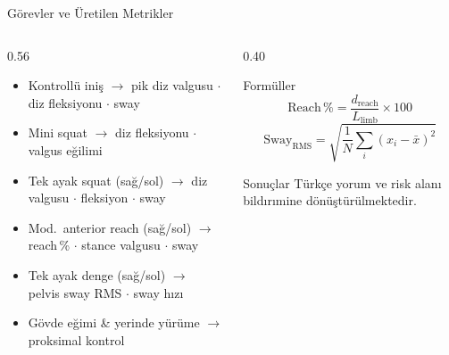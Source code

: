 \documentclass[aspectratio=169,12pt]{beamer}
\begin{document}
\begin{frame}{G\"{o}revler ve \"{U}retilen Metrikler}
  \begin{columns}[T]
    \begin{column}{0.56\textwidth}
      \begin{itemize}\setlength\itemsep{0.22em}
        \item Kontroll\"{u} ini\c{s} $\rightarrow$
              pik diz valgusu \(\cdot\) diz fleksiyonu \(\cdot\) sway
        \item Mini squat $\rightarrow$
              diz fleksiyonu \(\cdot\) valgus e\u{g}ilimi
        \item Tek ayak squat (sa\u{g}/sol) $\rightarrow$
              diz valgusu \(\cdot\) fleksiyon \(\cdot\) sway
        \item Mod.\ anterior reach (sa\u{g}/sol) $\rightarrow$
              reach\,\% \(\cdot\) stance valgusu \(\cdot\) sway
        \item Tek ayak denge (sa\u{g}/sol) $\rightarrow$
              pelvis sway RMS \(\cdot\) sway h\i{}z\i{}
        \item G\"{o}vde e\u{g}imi \& yerinde y\"{u}r\"{u}me $\rightarrow$
              proksimal kontrol
      \end{itemize}
    \end{column}

    \begin{column}{0.40\textwidth}
      \begin{block}{Form\"{u}ller}
        \[\mathrm{Reach\,\%} = \dfrac{d_{\mathrm{reach}}}{L_{\mathrm{limb}}} \times 100\]
        \[\mathrm{Sway_{RMS}} = \sqrt{\dfrac{1}{N}\sum_{i}(x_i - \bar{x})^2}\]
      \end{block}
      \vspace{0.4em}
      \small Sonu\c{c}lar T\"{u}rk\c{c}e yorum ve risk alan\i{} bild\i{}r\i{}mine
      d\"{o}n\"{u}\c{s}t\"{u}r\"{u}lmektedir.
    \end{column}
  \end{columns}
\end{frame}
\end{document}
